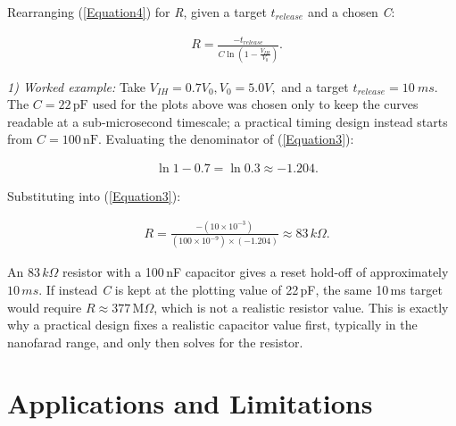 \documentclass[conference]{IEEEtran}
\begin{document}
Rearranging (\ref{Equation4}) for \textit{R}, given a target $t_{release}$ and a chosen \textit{C}:

\begin{equation}
    \begin{aligned}
        &R=\frac{-t_{release}}{C\ln{\left(1-\frac{V_{IH}}{V_0}\right)}}.
    \end{aligned}
    \label{Equation3}
\end{equation}

\textit{1) Worked example:} Take $V_{IH}=0.7V_0, V_0=5.0V,$ and a target $t_{release}=10\ ms$.  The $C=22\,\text{pF}$ used for the plots above was chosen only to keep the curves readable at a sub-microsecond timescale; a practical timing design instead starts from $C=100\,\text{nF}$.  Evaluating the denominator of (\ref{Equation3}):

\begin{equation}
    \begin{aligned}
        &\ln{1-0.7}=\ln{0.3}\approx-1.204.
    \end{aligned}
\end{equation}

\noindent Substituting into (\ref{Equation3}):

\begin{equation}
    \begin{aligned}
        &R=\frac{-\left(10\times10^{-3}\right)}{\left(100\times10^{-9}\right)\times(-1.204)}\approx 83\,k\Omega.
    \end{aligned}
\end{equation}

An $83\,k\Omega$ resistor with a 100\,nF capacitor gives a reset hold-off of approximately $10\,ms$.  If instead \textit{C} is kept at the plotting value of 22\,pF, the same 10\,ms target would require $R \approx 377\,\text{M}\Omega$, which is not a realistic resistor value. This is exactly why a practical design fixes a realistic capacitor value first, typically in the nanofarad range, and only then solves for the resistor.

\section{Applications and Limitations}
\end{document}
